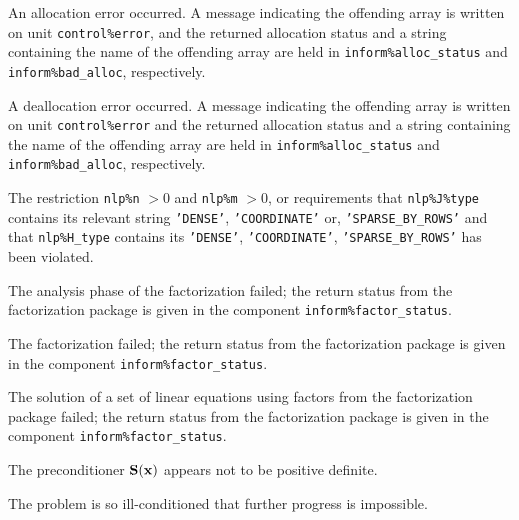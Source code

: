 \documentclass{galahad}
\begin{document}
\begin{description}

 An allocation error occurred.
A message indicating the offending
array is written on unit {\tt control\%error}, and the returned allocation
status and a string containing the name of the offending array
are held in {\tt inform\%alloc\_\-status}
and {\tt inform\%bad\_alloc}, respectively.

 A deallocation error occurred.
A message indicating the offending
array is written on unit {\tt control\%error} and the returned allocation
status and a string containing the name of the offending array
are held in {\tt inform\%alloc\_\-status}
and {\tt inform\%bad\_alloc}, respectively.

  The restriction {\tt nlp\%n} $> 0$ and {\tt nlp\%m} $> 0$,
  or requirements that
  {\tt nlp\%J\%type}  contains its relevant string
  \mbox{\tt 'DENSE'}, \mbox{\tt 'COORDINATE'} or, \mbox{\tt 'SPARSE\_BY\_ROWS'}
  and that {\tt nlp\%H\_type} contains its
  {\tt 'DENSE'}, {\tt 'COORDINATE'}, {\tt 'SPARSE\_BY\_ROWS'}
  has been violated.



 The analysis phase of the factorization failed;
 the return status from the factorization
    package is given in the component {\tt inform\%fac\-t\-or\_status}.

 The factorization failed;
 the return status from the factorization
    package is given in the component {\tt inform\%fac\-t\-or\_status}.

 The solution of a set of linear equations
 using factors from the factorization package failed;
 the return status from the factorization
    package is given in the component {\tt inform\%fac\-t\-or\_status}.

 The preconditioner ${\mathbf{S}}({\mathbf{x}})$ appears not to
  be positive definite.

 The problem is so ill-conditioned that
  further progress is impossible.


\end{description}
\end{document}
